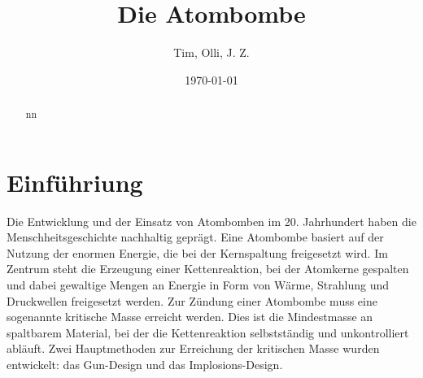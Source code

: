 \documentclass[a4paper,12pt]{article}
\title{Die Atombombe}
\author{Tim, Olli, J. Z.}
\date{\today}
\begin{document}
\pagestyle{fancy}

\fancyfoot[LE,RO]{\thepage}

\maketitle

\begin{abstract}
nn
\end{abstract}

\newpage

\tableofcontents

\newpage

\section{Einführiung}
Die Entwicklung und der Einsatz von Atombomben im 20. Jahrhundert haben die Menschheitsgeschichte nachhaltig geprägt. Eine Atombombe basiert auf der Nutzung der enormen Energie, die bei der Kernspaltung freigesetzt wird. Im Zentrum steht die Erzeugung einer Kettenreaktion, bei der Atomkerne gespalten und dabei gewaltige Mengen an Energie in Form von Wärme, Strahlung und Druckwellen freigesetzt werden.
Zur Zündung einer Atombombe muss eine sogenannte kritische Masse erreicht werden. Dies ist die Mindestmasse an spaltbarem Material, bei der die Kettenreaktion selbstständig und unkontrolliert abläuft. Zwei Hauptmethoden zur Erreichung der kritischen Masse wurden entwickelt: das Gun-Design und das Implosions-Design.
\end{document}

